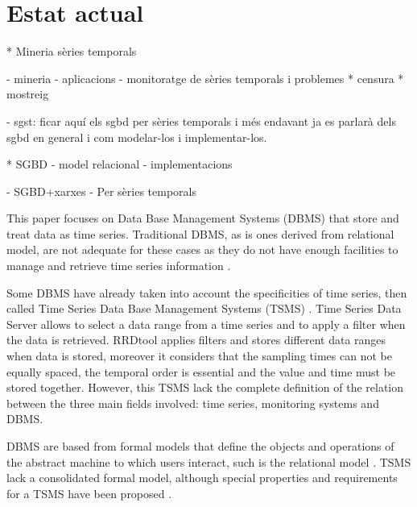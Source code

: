 \chapter{Estat actual}
\label{cap:estat}




* Mineria sèries temporals
  
  - mineria
  - aplicacions
  - monitoratge de sèries temporals i problemes
     * censura
     * mostreig

  - sgst: 
      ficar aquí els sgbd per sèries temporals i més endavant ja es parlarà dels sgbd en general i com modelar-los i implementar-los.


* SGBD
 - model relacional
 - implementacions

    - SGBD+xarxes
    - Per sèries temporals




This paper focuses on Data Base Management Systems (DBMS) that store
and treat data as time series.  Traditional DBMS, as is ones derived
from relational model, are not adequate for these cases as they do not
have enough facilities to manage and retrieve time series
information \parencite{schmidt95}.

Some DBMS have already taken into account the specificities of time
series, then called Time Series Data Base Management Systems
(TSMS) \parencite{dreyer94}.  Time Series Data
Server \parencite{weigel10} allows to select a data range from a time
series and to apply a filter when the data is retrieved.
RRDtool \parencite{rrdtool} applies filters and stores different data
ranges when data is stored, moreover it considers that the sampling
times can not be equally spaced, the temporal order is essential and
the value and time must be stored together. However, this TSMS lack
the complete definition of the relation between the three main fields
involved: time series, monitoring systems and DBMS.




DBMS are based from formal models that define the objects and
operations of the abstract machine to which users interact, such is
the relational model \parencite{date}. TSMS lack a consolidated formal
model, although special properties and requirements for a TSMS
have been proposed \parencite{dreyer94}.


